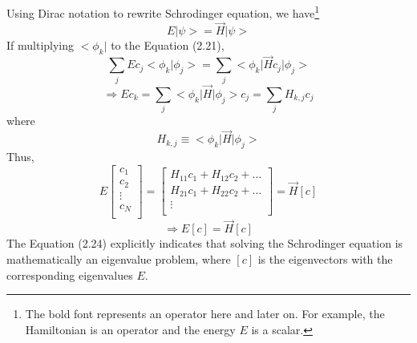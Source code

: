 \begin{equation}
\end{equation} Using Dirac notation to rewrite Schrodinger equation, we have\footnote{The bold font represents an operator here and later on. For example, the Hamiltonian is an operator and the energy $E$ is a scalar.} \begin{equation}
    E\big|\psi\big> = \vec{H}\big|\psi\big>
\end{equation} If multiplying $\big<\phi_{k}\big|$ to the Equation (2.21), \begin{equation}
    \sum_{j}Ec_{j}\big<\phi_{k}\big|\phi_{j}\big>=\sum_{j}\big<\phi_{k}\big|\vec{H}c_{j}\big|\phi_{j}\big> \nonumber
\end{equation} \begin{equation}
    \Rightarrow Ec_{k} = \sum_{j}{\big<\phi_{k}\big|\vec{H}\big|\phi_{j}\big>c_{j}} = \sum_{j}{H_{k,j}c_{j}}
\end{equation} where \begin{equation}
    H_{k,j} \equiv \big<\phi_{k}\big|\vec{H}\big|\phi_{j}\big>
\end{equation} Thus, \begin{equation}
    E \left[
    \begin{matrix}
    c_{1} \\
    c_{2} \\
    \vdots \\
    c_{N} \\
    \end{matrix}
    \right] = \left[
    \begin{matrix}
    H_{11}c_{1}+H_{12}c_{2}+\ldots \\
    H_{21}c_{1}+H_{22}c_{2}+\ldots \\
    \vdots \\
    \end{matrix}
    \right] = \vec{H}\left[c\right] \nonumber
\end{equation} \begin{equation}
    \Rightarrow\boxed{E\left[c\right]=\vec{H}\left[c\right]}
\end{equation} The Equation (2.24) explicitly indicates that solving the Schrodinger equation is mathematically an eigenvalue problem, where $\left[c\right]$ is the eigenvectors with the corresponding eigenvalues $E$.
